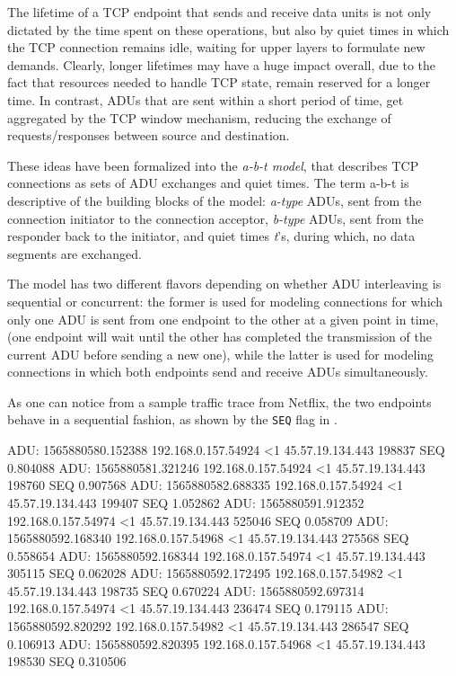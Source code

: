The lifetime of a TCP endpoint that sends and receive data units is not only
dictated by the time spent on these operations, but also by quiet times in
which the TCP connection remains idle, waiting for upper layers to formulate
new demands. Clearly, longer lifetimes may have a huge impact overall, due to
the fact that resources needed to handle TCP state, remain reserved for a
longer time. In contrast, ADUs that are sent within a short period of time, get
aggregated by the TCP window mechanism, reducing the exchange of
requests/responses between source and destination.

These ideas have been formalized into the \emph{a-b-t model}, that describes
TCP connections as sets of ADU exchanges and quiet times. The term a-b-t is
descriptive of the building blocks of the model: \emph{a-type} ADUs, sent from
the connection initiator to the connection acceptor, \emph{b-type} ADUs, sent
from the responder back to the initiator, and quiet times \emph{t}'s, during
which, no data segments are exchanged.

The model has two different flavors depending on whether ADU interleaving is
sequential or concurrent: the former is used for modeling connections for which
only one ADU is sent from one endpoint to the other at a given point in time,
(one endpoint will wait until the other has completed the transmission of the
current ADU before sending a new one), while the latter is used for modeling
connections in which both endpoints send and receive ADUs simultaneously.

As one can notice from a sample traffic trace from Netflix, the two endpoints
behave in a sequential fashion, as shown by the \texttt{SEQ} flag in
.

\begin{adu}[caption={Incoming traffic trace of Mulan, captured at 10Mbps (first 10 segments).}, label={lst:adutrace}]
ADU: 1565880580.152388 192.168.0.157.54924 <1 45.57.19.134.443 198837 SEQ 0.804088
ADU: 1565880581.321246 192.168.0.157.54924 <1 45.57.19.134.443 198760 SEQ 0.907568
ADU: 1565880582.688335 192.168.0.157.54924 <1 45.57.19.134.443 199407 SEQ 1.052862
ADU: 1565880591.912352 192.168.0.157.54974 <1 45.57.19.134.443 525046 SEQ 0.058709
ADU: 1565880592.168340 192.168.0.157.54968 <1 45.57.19.134.443 275568 SEQ 0.558654
ADU: 1565880592.168344 192.168.0.157.54974 <1 45.57.19.134.443 305115 SEQ 0.062028
ADU: 1565880592.172495 192.168.0.157.54982 <1 45.57.19.134.443 198735 SEQ 0.670224
ADU: 1565880592.697314 192.168.0.157.54974 <1 45.57.19.134.443 236474 SEQ 0.179115
ADU: 1565880592.820292 192.168.0.157.54982 <1 45.57.19.134.443 286547 SEQ 0.106913
ADU: 1565880592.820395 192.168.0.157.54968 <1 45.57.19.134.443 198530 SEQ 0.310506
\end{adu}

